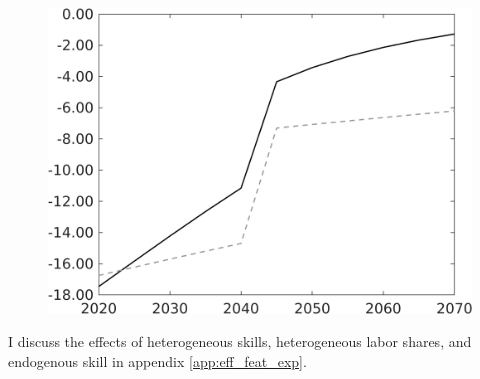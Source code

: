 \begin{figure}[h!!]
	\begin{minipage}[]{0.32\textwidth}
		\includegraphics[width=1\textwidth]{../../codding_model/own_basedOnFried/optimalPol_010922_revision/figures/all_13Sept22/CompTaufPER_bytaul_KN_Reg0_gAg_spillover0_nsk0_xgr0_knspil0_sep0_LFlimit1_emsbase0_countec0_GovRev0_etaa0.79_lgd0.png} \end{minipage}		
\end{figure}

I discuss the effects of heterogeneous skills, heterogeneous labor shares, and endogenous skill in appendix \ref{app:eff_feat_exp}. 

